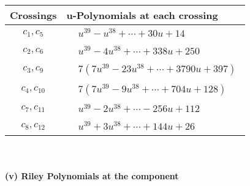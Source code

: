 \documentclass[1p]{elsarticle_modified}
\theoremstyle{definition}
\begin{document}
\begin{tabular}{m{50pt}|m{274pt}}
Crossings & \hspace{64pt}u-Polynomials at each crossing \\
\hline $$\begin{aligned}c_{1},c_{5}\end{aligned}$$&$\begin{aligned}
&u^{39}- u^{38}+\cdots+30 u+14
\end{aligned}$\\
\hline $$\begin{aligned}c_{2},c_{6}\end{aligned}$$&$\begin{aligned}
&u^{39}-4 u^{38}+\cdots+338 u+250
\end{aligned}$\\
\hline $$\begin{aligned}c_{3},c_{9}\end{aligned}$$&$\begin{aligned}
&7(7 u^{39}-23 u^{38}+\cdots+3790 u+397)
\end{aligned}$\\
\hline $$\begin{aligned}c_{4},c_{10}\end{aligned}$$&$\begin{aligned}
&7(7 u^{39}-9 u^{38}+\cdots+704 u+128)
\end{aligned}$\\
\hline $$\begin{aligned}c_{7},c_{11}\end{aligned}$$&$\begin{aligned}
&u^{39}-2 u^{38}+\cdots-256 u+112
\end{aligned}$\\
\hline $$\begin{aligned}c_{8},c_{12}\end{aligned}$$&$\begin{aligned}
&u^{39}+3 u^{38}+\cdots+144 u+26
\end{aligned}$\\
\hline
\end{tabular}\\~\\
\newpage\renewcommand{\arraystretch}{1}
\flushleft \textbf{(v) Riley Polynomials at the component}\newline \\
\end{document}
